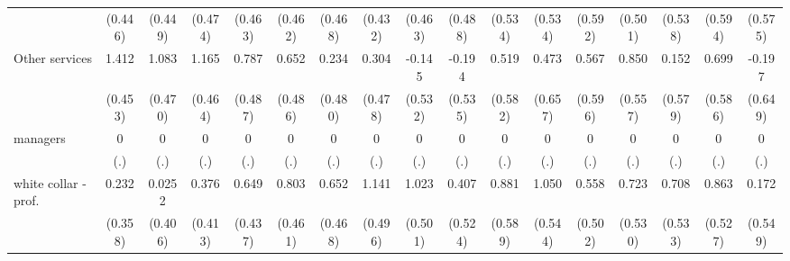 {\begin{tabular}{l*{16}{c}}
                    &     (0.446)         &     (0.449)         &     (0.474)         &     (0.463)         &     (0.462)         &     (0.468)         &     (0.432)         &     (0.463)         &     (0.488)         &     (0.534)         &     (0.534)         &     (0.592)         &     (0.501)         &     (0.538)         &     (0.594)         &     (0.575)         \\
[1em]
Other services      &       1.412\sym{**} &       1.083\sym{*}  &       1.165\sym{*}  &       0.787         &       0.652         &       0.234         &       0.304         &      -0.145         &      -0.194         &       0.519         &       0.473         &       0.567         &       0.850         &       0.152         &       0.699         &      -0.197         \\
                    &     (0.453)         &     (0.470)         &     (0.464)         &     (0.487)         &     (0.486)         &     (0.480)         &     (0.478)         &     (0.532)         &     (0.535)         &     (0.582)         &     (0.657)         &     (0.596)         &     (0.557)         &     (0.579)         &     (0.586)         &     (0.649)         \\
[1em]
managers            &           0         &           0         &           0         &           0         &           0         &           0         &           0         &           0         &           0         &           0         &           0         &           0         &           0         &           0         &           0         &           0         \\
                    &         (.)         &         (.)         &         (.)         &         (.)         &         (.)         &         (.)         &         (.)         &         (.)         &         (.)         &         (.)         &         (.)         &         (.)         &         (.)         &         (.)         &         (.)         &         (.)         \\
[1em]
white collar - prof.&       0.232         &      0.0252         &       0.376         &       0.649         &       0.803         &       0.652         &       1.141\sym{*}  &       1.023\sym{*}  &       0.407         &       0.881         &       1.050         &       0.558         &       0.723         &       0.708         &       0.863         &       0.172         \\
                    &     (0.358)         &     (0.406)         &     (0.413)         &     (0.437)         &     (0.461)         &     (0.468)         &     (0.496)         &     (0.501)         &     (0.524)         &     (0.589)         &     (0.544)         &     (0.502)         &     (0.530)         &     (0.533)         &     (0.527)         &     (0.549)         \\

\end{tabular}}
